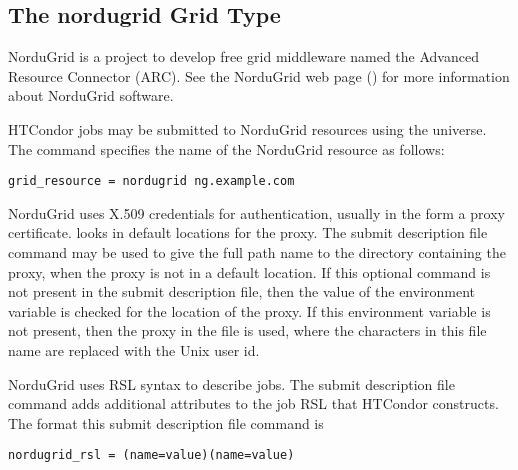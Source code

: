 
\subsection{\label{sec:NorduGrid}The nordugrid Grid Type }

NorduGrid is a project to develop free grid middleware named
the Advanced  Resource Connector (ARC).
See the NorduGrid web page ()
for more information about NorduGrid software.

HTCondor jobs may be submitted to
NorduGrid resources using the  universe.
The  command specifies the name of the
NorduGrid resource as follows:
\begin{verbatim}
grid_resource = nordugrid ng.example.com
\end{verbatim}

NorduGrid uses X.509 credentials for authentication,
usually in the form a proxy certificate. 
 looks in default locations for the proxy. 
The submit description file command 
may be used to give the full path name to the directory containing the proxy,
when the proxy is not in a default location.
If this optional command is not present in the submit description file,
then the value of the environment variable
 is checked for the location of the proxy.
If this environment variable is not present, then 
the proxy in the file
 is used,
where the characters \verb@XXXX@ in this file name are
replaced with the Unix user id.

NorduGrid uses RSL syntax to describe jobs.
The submit description file command
adds additional attributes to the job RSL that HTCondor
constructs. 
The format this submit description file command is
\begin{verbatim}
nordugrid_rsl = (name=value)(name=value)
\end{verbatim}

